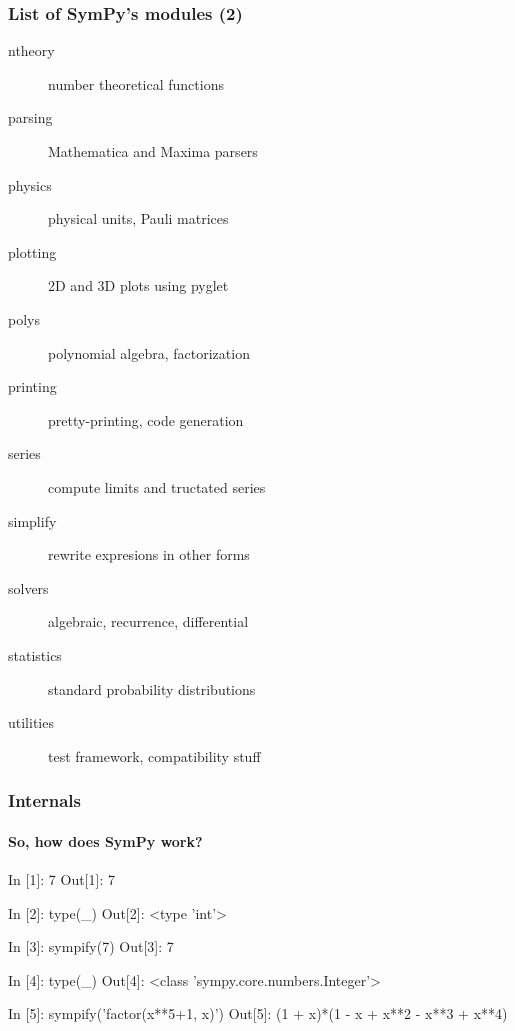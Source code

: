\documentclass[handout]{beamer}
\begin{document}
\begin{frame}[fragile]
    \frametitle{List of SymPy's modules (2)}

    \begin{description}
        \item[ntheory] number theoretical functions
        \item[parsing] Mathematica and Maxima parsers
        \item[physics] physical units, Pauli matrices
        \item[plotting] 2D and 3D plots using pyglet
        \item[polys] polynomial algebra, factorization
        \item[printing] pretty-printing, code generation
        \item[series] compute limits and tructated series
        \item[simplify] rewrite expresions in other forms
        \item[solvers] algebraic, recurrence, differential
        \item[statistics] standard probability distributions
        \item[utilities] test framework, compatibility stuff
    \end{description}
\end{frame}

\begin{frame}[fragile]
    \frametitle{Internals}
    \framesubtitle{So, how does SymPy work?}

    \begin{python}
In [1]: 7
Out[1]: 7

In [2]: type(_)
Out[2]: <type 'int'>

In [3]: sympify(7)
Out[3]: 7

In [4]: type(_)
Out[4]: <class 'sympy.core.numbers.Integer'>

In [5]: sympify('factor(x**5+1, x)')
Out[5]: (1 + x)*(1 - x + x**2 - x**3 + x**4)
    \end{python}
\end{frame}
\end{document}
